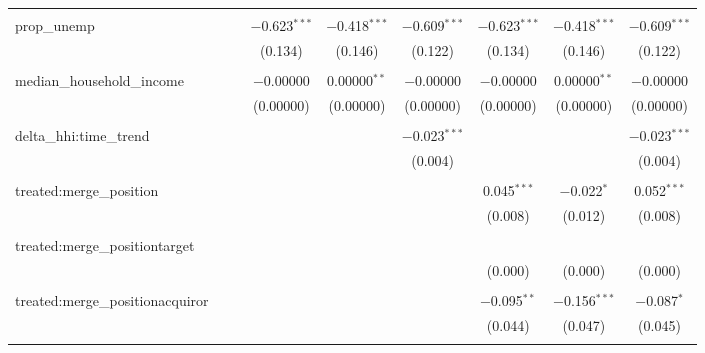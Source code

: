 \begin{table}[H]
{\begin{tabular}{@{\extracolsep{5pt}}lcccccccc}
   & & & & & & & & \\  

  prop\_unemp &  &  & $-$0.623$^{***}$ & $-$0.418$^{***}$ & $-$0.609$^{***}$ & $-$0.623$^{***}$ & $-$0.418$^{***}$ & $-$0.609$^{***}$ \\  

   &  &  & (0.134) & (0.146) & (0.122) & (0.134) & (0.146) & (0.122) \\  

   & & & & & & & & \\  

  median\_household\_income &  &  & $-$0.00000 & 0.00000$^{**}$ & $-$0.00000 & $-$0.00000 & 0.00000$^{**}$ & $-$0.00000 \\  

   &  &  & (0.00000) & (0.00000) & (0.00000) & (0.00000) & (0.00000) & (0.00000) \\  

   & & & & & & & & \\  

  delta\_hhi:time\_trend &  &  &  &  & $-$0.023$^{***}$ &  &  & $-$0.023$^{***}$ \\  

   &  &  &  &  & (0.004) &  &  & (0.004) \\  

   & & & & & & & & \\  

  treated:merge\_position &  &  &  &  &  & 0.045$^{***}$ & $-$0.022$^{*}$ & 0.052$^{***}$ \\  

   &  &  &  &  &  & (0.008) & (0.012) & (0.008) \\  

   & & & & & & & & \\  

  treated:merge\_positiontarget &  &  &  &  &  &  &  &  \\  

   &  &  &  &  &  & (0.000) & (0.000) & (0.000) \\  

   & & & & & & & & \\  

  treated:merge\_positionacquiror &  &  &  &  &  & $-$0.095$^{**}$ & $-$0.156$^{***}$ & $-$0.087$^{*}$ \\  

   &  &  &  &  &  & (0.044) & (0.047) & (0.045) \\  

   & & & & & & & & \\  


\end{tabular}}
\end{table}
